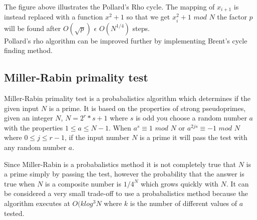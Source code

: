The figure above illustrates the Pollard's Rho cycle. The mapping of $x_{i+1}$ is instead replaced with a function $x^2+1$ so that we get $x^2_{i}+1$  $mod$ $N$ the factor $p$ will be found after $O(\sqrt{p})$  $\epsilon$ $O(N^{1/4})$ steps. \cite{avalg}\\

Pollard's rho algorithm can be improved further by implementing Brent's cycle finding method. \cite{brent}

\subsection{Miller-Rabin primality test}
Miller-Rabin primality test is a probabalistics algorithm which determines if the given input $N$ is a prime. It is based on the properties of strong pseudoprimes, given an integer $N$, $N = 2^r * s + 1$ where $s$ is odd you choose a random number $a$ with the properties $1 \leq a \leq N - 1$. When $a^s \equiv 1$ $mod$ $N$ or $a^{2js} \equiv - 1$ $mod$ $N$ where $0 \leq j \leq r - 1$, if the input number $N$ is a prime it will pass the test with any random number $a$.

Since Miller-Rabin is a probabalistics method it is not completely true that $N$ is a prime simply by passing the test, however the probability that the answer is true when $N$ is a composite number is $1 / 4^{N}$ which grows quickly with $N$. It can be considered a very small trade-off to use a probabalistics method because the algorithm executes at $O(k log^3 N$ where $k$ is the number of different values of $a$ tested. \cite{miller}